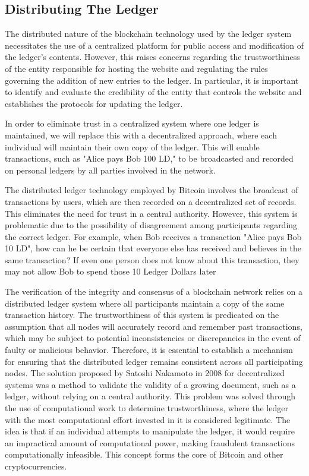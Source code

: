 \subsection{Distributing The Ledger}
The distributed nature of the blockchain technology used by the ledger system necessitates the use of a centralized platform for public access
and modification of the ledger's contents. However, this raises concerns regarding the trustworthiness of the entity responsible for hosting
the website and regulating the rules governing the addition of new entries to the ledger. In particular, it is important to identify and
evaluate the credibility of the entity that controls the website and establishes the protocols for updating the ledger.

In order to eliminate trust in a centralized system where one ledger is maintained, we will replace this with a decentralized approach, where
each individual will maintain their own copy of the ledger. This will enable transactions, such as "Alice pays Bob 100 LD," to be broadcasted
and recorded on personal ledgers by all parties involved in the network.

The distributed ledger technology employed by Bitcoin involves the broadcast of transactions by users, which are then recorded on a
decentralized set of records. This eliminates the need for trust in a central authority. However, this system is problematic due to the
possibility of disagreement among participants regarding the correct ledger. For example, when Bob receives a transaction "Alice pays Bob
10 LD", how can he be certain that everyone else has received and believes in the same transaction? If even one person does not know about
this transaction, they may not allow Bob to spend those 10 Ledger Dollars later

%

The verification of the integrity and consensus of a blockchain network relies on a distributed ledger system where all participants maintain
a copy of the same transaction history. The trustworthiness of this system is predicated on the assumption that all nodes will accurately
record and remember past transactions, which may be subject to potential inconsistencies or discrepancies in the event of faulty or malicious
behavior. Therefore, it is essential to establish a mechanism for ensuring that the distributed ledger remains consistent across all
participating nodes. The solution proposed by Satoshi Nakamoto in 2008 for decentralized systems was a method to validate the validity of
a growing document, such as a ledger, without relying on a central authority. This problem was solved through the use of computational
work to determine trustworthiness, where the ledger with the most computational effort invested in it is considered legitimate. The idea
is that if an individual attempts to manipulate the ledger, it would require an impractical amount of computational power, making fraudulent
transactions computationally infeasible. This concept forms the core of Bitcoin and other cryptocurrencies.
